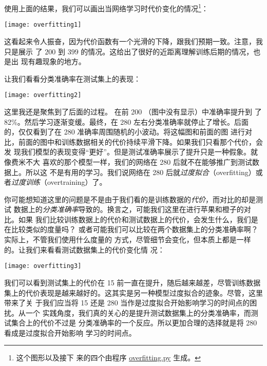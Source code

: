 使用上面的结果，我们可以画出当网络学习时代价变化的情况\footnote{这个图形以及接下
  来的四个由程序
  \href{https://github.com/mnielsen/neural-networks-and-deep-learning/blob/master/fig/overfitting.py}{overfitting.py}
  生成。}：
\begin{center}
  \texttt{[image: overfitting1]}
\end{center}
  
这看起来令人振奋，因为代价函数有一个光滑的下降，跟我们预期一致。注意，我只是展示
了 $200$ 到 $399$ \epoch{}的情况。这给出了很好的近距离理解训练后期的情况，也是出
现有趣现象的地方。

让我们看看分类准确率在测试集上的表现：
\begin{center}
  \texttt{[image: overfitting2]}
\end{center}

这里我还是聚焦到了后面的过程。 在前 200 \epochs{}（图中没有显示）中准确率提升到
了 82\%。然后学习逐渐变缓。最终，在 280 \epoch{}左右分类准确率就停止了增长。后面
的\epochs{}，仅仅看到了在 280 \epoch{}准确率周围随机的小波动。将这幅图和前面的图
进行对比，前面的图中和训练数据相关的代价持续平滑下降。如果我们只看那个代价，会发
现我们模型的表现变得“更好”。但是测试准确率展示了提升只是一种假象。就像费米不大
喜欢的那个模型一样，我们的网络在 280 \epoch{}后就不在能够推广到测试数据上。所以这
不是有用的学习。我们说网络在 280 \epoch{}后就\emph{过度拟合}（overfitting）或者\emph{过度训练}（overtraining）了。

你可能想知道这里的问题是不是由于我们看的是训练数据的\emph{代价}，而对比的却是测试
数据上的\emph{分类准确率}导致的。换言之，可能我们这里在进行苹果和橙子的对比。如果
我们比较训练数据上的代价和测试数据上的代价，会发生什么，我们是在比较类似的度量吗？
或者可能我们可以比较在两个数据集上的分类准确率啊？实际上，不管我们使用什么度量的
方式，尽管细节会变化，但本质上都是一样的。让我们来看看测试数据集上的代价变化情
况：
\begin{center}
  \texttt{[image: overfitting3]}
\end{center}

我们可以看到测试集上的代价在 15 \epoch{}前一直在提升，随后越来越差，尽管训练数据
集上的代价表现是越来越好的。这其实是另一种模型过度拟合的迹象。尽管，这里带来了关
于我们应当将 15 还是 280 \epoch{}当作是过度拟合开始影响学习的时间点的困扰。从一个
实践角度，我们真的关心的是提升测试数据集上的分类准确率，而测试集合上的代价不过是
分类准确率的一个反应。所以更加合理的选择就是将 280 \epoch{}看成是过度拟合开始影响
学习的时间点。

